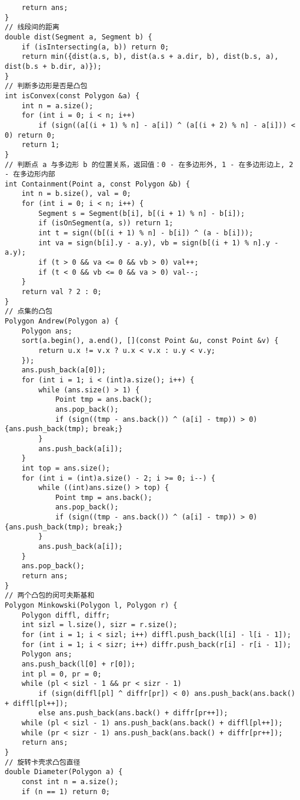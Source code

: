 \begin{verbatim}
    return ans;
}
// 线段间的距离
double dist(Segment a, Segment b) {
    if (isIntersecting(a, b)) return 0;
    return min({dist(a.s, b), dist(a.s + a.dir, b), dist(b.s, a), dist(b.s + b.dir, a)});
}
// 判断多边形是否是凸包
int isConvex(const Polygon &a) {
    int n = a.size();
    for (int i = 0; i < n; i++)
        if (sign((a[(i + 1) % n] - a[i]) ^ (a[(i + 2) % n] - a[i])) < 0) return 0;
    return 1;
}
// 判断点 a 与多边形 b 的位置关系，返回值：0 - 在多边形外, 1 - 在多边形边上, 2 - 在多边形内部
int Containment(Point a, const Polygon &b) {
    int n = b.size(), val = 0;
    for (int i = 0; i < n; i++) {
        Segment s = Segment(b[i], b[(i + 1) % n] - b[i]);
        if (isOnSegment(a, s)) return 1;
        int t = sign((b[(i + 1) % n] - b[i]) ^ (a - b[i]));
        int va = sign(b[i].y - a.y), vb = sign(b[(i + 1) % n].y - a.y);
        if (t > 0 && va <= 0 && vb > 0) val++;
        if (t < 0 && vb <= 0 && va > 0) val--;
    }
    return val ? 2 : 0;
}
// 点集的凸包
Polygon Andrew(Polygon a) {
    Polygon ans;
    sort(a.begin(), a.end(), [](const Point &u, const Point &v) {
        return u.x != v.x ? u.x < v.x : u.y < v.y;
    });
    ans.push_back(a[0]);
    for (int i = 1; i < (int)a.size(); i++) {
        while (ans.size() > 1) {
            Point tmp = ans.back();
            ans.pop_back();
            if (sign((tmp - ans.back()) ^ (a[i] - tmp)) > 0) {ans.push_back(tmp); break;}
        }
        ans.push_back(a[i]);
    }
    int top = ans.size();
    for (int i = (int)a.size() - 2; i >= 0; i--) {
        while ((int)ans.size() > top) {
            Point tmp = ans.back();
            ans.pop_back();
            if (sign((tmp - ans.back()) ^ (a[i] - tmp)) > 0) {ans.push_back(tmp); break;}
        }
        ans.push_back(a[i]);
    }
    ans.pop_back();
    return ans;
}
// 两个凸包的闵可夫斯基和
Polygon Minkowski(Polygon l, Polygon r) {
    Polygon diffl, diffr;
    int sizl = l.size(), sizr = r.size();
    for (int i = 1; i < sizl; i++) diffl.push_back(l[i] - l[i - 1]);
    for (int i = 1; i < sizr; i++) diffr.push_back(r[i] - r[i - 1]);
    Polygon ans;
    ans.push_back(l[0] + r[0]);
    int pl = 0, pr = 0;
    while (pl < sizl - 1 && pr < sizr - 1)
        if (sign(diffl[pl] ^ diffr[pr]) < 0) ans.push_back(ans.back() + diffl[pl++]);
        else ans.push_back(ans.back() + diffr[pr++]);
    while (pl < sizl - 1) ans.push_back(ans.back() + diffl[pl++]);
    while (pr < sizr - 1) ans.push_back(ans.back() + diffr[pr++]);
    return ans;
}
// 旋转卡壳求凸包直径
double Diameter(Polygon a) {
    const int n = a.size();
    if (n == 1) return 0;

\end{verbatim}

